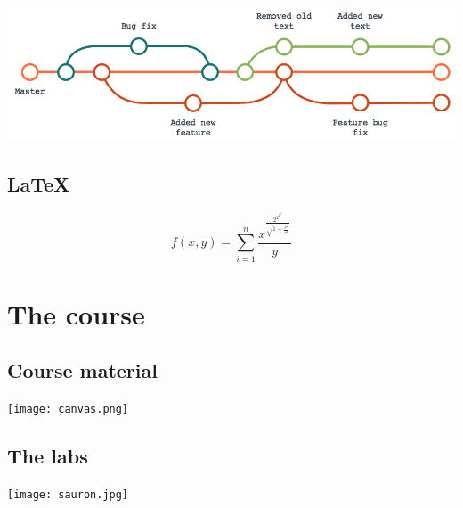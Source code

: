 \begin{frame}
  \includegraphics[width=\columnwidth]{version-tree.png}
\end{frame}


\subsection{\LaTeX}

\begin{frame}
\[
  f(x, y) = \sum_{i=1}^n 
  \frac{x^{\frac{2^{2^{2^{2^n}}}}{\sqrt{1-\frac{v^2}{c^2}}}}}{y}
\]

\end{frame}

\begin{frame}[fragile]
  
\end{frame}


\section{The course}

\subsection{Course material}

\begin{frame}
  \texttt{[image: canvas.png]}
\end{frame}

\subsection{The labs}

\begin{frame}
  \texttt{[image: sauron.jpg]}
\end{frame}



\begin{frame}[allowframebreaks]
  \printbibliography{}
\end{frame}
